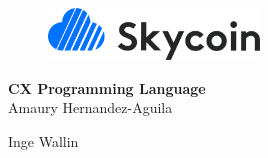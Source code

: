 \documentclass[11pt,fleqn,openany]{book} %
\begin{document}
\raggedbottom


\begingroup
\thispagestyle{empty}
\centering

\vspace*{2.5cm}

\begin{figure}[h]
    \centering
    \includegraphics[width=0.5\textwidth]{img/skycoin-logo.png}
\end{figure}

\vspace*{2.5cm}
\par\normalfont\fontsize{35}{35}\sffamily\selectfont
\textbf{CX Programming Language}\\
\vspace*{1cm}
{\Huge Amaury Hernandez-Aguila}\par %
{\Huge Inge Wallin}\par %

\endgroup


\newpage
~\vfill
\thispagestyle{empty}




\noindent \textit{} %

\end{document}
